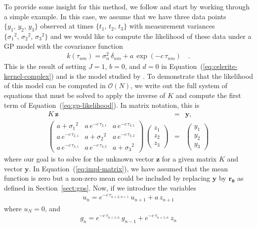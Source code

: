 \documentclass[manuscript, letterpaper]{aastex6}
\renewcommand{\eqref}[1]{\ref{eq:#1}}
\newcommand{\Eq}[1]{Equation~(\eqref{#1})}
\newcommand{\eq}[1]{\Eq{#1}}
\newcommand{\eqlabel}[1]{\label{eq:#1}}
\newcommand{\sectionname}{Section}
\newcommand{\sectref}[1]{\ref{sect:#1}}
\newcommand{\Sect}[1]{\sectionname~\sectref{#1}}
\newcommand{\sect}[1]{\Sect{#1}}
\newcommand{\bvec}[1]{{\ensuremath{\boldsymbol{#1}}}}
\begin{document}
To provide some insight for this method, we follow
\citet{Ambikasaran:2015} and start by working through a simple example.
In this case, we assume that we have three data points
$\{y_1,\,y_2,\,y_3\}$ observed at times $\{t_1,\,t_2,\,t_3\}$ with measurement
variances $\{{\sigma_1}^2,\,{\sigma_2}^2,\,{\sigma_3}^2\}$ and we would
like to compute the likelihood of these data under a GP model with the
covariance function
\begin{eqnarray}
k(\tau_{nm}) = \sigma_n^2\,\delta_{nm} + a\,\exp(-c\,\tau_{nm})\quad.
\end{eqnarray}
This is the result of setting $J=1$, $b=0$, and $d=0$ in
\eq{celerite-kernel-complex} and is the model studied by
\citet{Rybicki:1995}.
To demonstrate that the likelihood of this model can be computed in
$\mathcal{O}(N)$, we write out the full system of
equations that must be solved to apply the inverse of $K$ and compute
the first term of \eq{gp-likelihood}.
In matrix notation, this is
\begin{eqnarray}\eqlabel{impl-matrix}
K\,\bvec{z} &=& \bvec{y}, \\
\begin{pmatrix}
    a+{\sigma_1}^2 & a\,e^{-c\,\tau_{2,1}} & a\,e^{-c\,\tau_{3,1}}\\
    a\,e^{-c\,\tau_{2,1}} & a+{\sigma_2}^2 & a\,e^{-c\,\tau_{3,2}}\\
    a\,e^{-c\,\tau_{3,1}} & a\,e^{-c\,\tau_{3,2}} & a+{\sigma_3}^2
\end{pmatrix}\,
\begin{pmatrix}
    z_1 \\ z_2 \\ z_3
\end{pmatrix} &=&
\begin{pmatrix}
    y_1 \\ y_2 \\ y_3
\end{pmatrix}
\end{eqnarray}
where our goal is to solve for the unknown vector \bvec{z} for a given matrix
$K$ and vector \bvec{y}.
In \eq{impl-matrix}, we have assumed that the mean function is zero but a
non-zero mean could be included by replacing \bvec{y} by
$\bvec{r}_\bvec{\theta}$ as defined in \sect{gps}.
Now, if we introduce the variables
\begin{eqnarray}\eqlabel{algo-first}
    u_n = e^{-c\,\tau_{n+2,n+1}}\,u_{n+1} + a\,z_{n+1}
\end{eqnarray}
where $u_{N} = 0$, and
\begin{eqnarray}
    g_n = e^{-c\,\tau_{n+1,n}}\,g_{n-1} + e^{-c\,\tau_{n+1,n}}\,z_{n}
\end{eqnarray}
\end{document}
